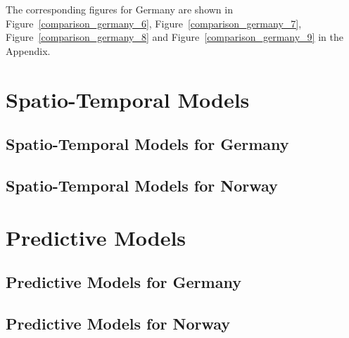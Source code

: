 %     
The corresponding figures for Germany are shown in Figure~\ref{comparison_germany_6}, Figure~\ref{comparison_germany_7}, Figure~\ref{comparison_germany_8} and Figure~\ref{comparison_germany_9} in the Appendix. \\
\clearpage
\section{Spatio-Temporal Models}
\subsection{Spatio-Temporal Models for Germany}
\subsection{Spatio-Temporal Models for Norway}
\clearpage
\section{Predictive Models}
\subsection{Predictive Models for Germany}
\subsection{Predictive Models for Norway}